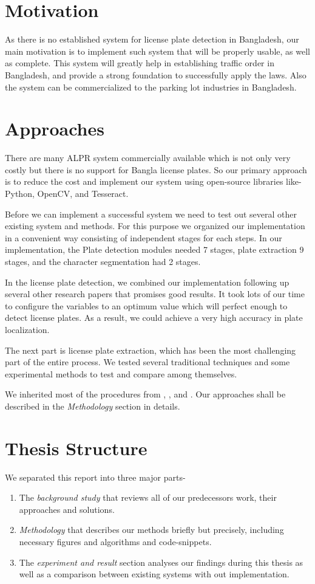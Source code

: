 \documentclass{standalone}
\begin{document}
    
    
    
\section{Motivation}
As there is no established system for license plate detection in Bangladesh, our main motivation is to implement such system that will be properly usable, as well as complete. This system will greatly help in establishing traffic order in Bangladesh, and provide a strong foundation to successfully apply the laws. Also the system can be commercialized to the parking lot industries in Bangladesh. 




\section{Approaches}
There are many ALPR system commercially available which is not only very costly but there is no support for Bangla license plates. So our primary approach is to reduce the cost and implement our system using open-source libraries like- Python, OpenCV, and Tesseract.

Before we can implement a successful system we need to test out several other existing system and methods. For this purpose we organized our implementation in a convenient way consisting of independent stages for each steps. In our implementation, the Plate detection modules needed 7 stages, plate extraction 9 stages, and the character segmentation had 2 stages.

In the license plate detection, we combined our implementation following up several other research papers that promises good results. It took lots of our time to configure the variables to an optimum value which will perfect enough to detect license plates. As a result, we could achieve a very high accuracy in plate localization.

The next part is license plate extraction, which has been the most challenging part of the entire process. We tested several traditional techniques and some experimental methods to test and compare among themselves. 

We inherited most of the procedures from \cite{Abolghasemi2009}, \cite{zheng2005efficient}, and \cite{joarder2012bangla}. Our approaches shall be described in the {\it Methodology} section in details. 


\section{Thesis Structure}
We separated this report into three major parts-
\begin{enumerate}
    \item The {\it background study} that reviews all of our predecessors work, their approaches and solutions.    
    \item {\it Methodology} that describes our methods briefly but precisely, including necessary figures and algorithms and code-snippets.
    \item The {\it experiment and result} section analyses our findings during this thesis as well as a comparison between existing systems with out implementation.
\end{enumerate}
\end{document}
